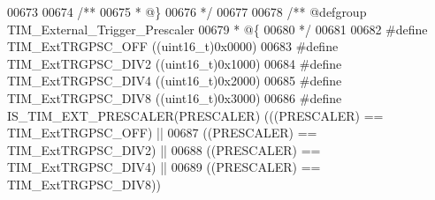 \begin{DoxyCode}
00673 
00674 \textcolor{comment}{/**}
00675 \textcolor{comment}{  * @\}}
00676 \textcolor{comment}{  */}
00677 
00678 \textcolor{comment}{/** @defgroup TIM\_External\_Trigger\_Prescaler }
00679 \textcolor{comment}{  * @\{}
00680 \textcolor{comment}{  */}
00681 
00682 \textcolor{preprocessor}{#}\textcolor{preprocessor}{define} \textcolor{preprocessor}{TIM\_ExtTRGPSC\_OFF}                  \textcolor{preprocessor}{(}\textcolor{preprocessor}{(}\textcolor{preprocessor}{uint16\_t}\textcolor{preprocessor}{)}0x0000\textcolor{preprocessor}{)}
00683 \textcolor{preprocessor}{#}\textcolor{preprocessor}{define} \textcolor{preprocessor}{TIM\_ExtTRGPSC\_DIV2}                 \textcolor{preprocessor}{(}\textcolor{preprocessor}{(}\textcolor{preprocessor}{uint16\_t}\textcolor{preprocessor}{)}0x1000\textcolor{preprocessor}{)}
00684 \textcolor{preprocessor}{#}\textcolor{preprocessor}{define} \textcolor{preprocessor}{TIM\_ExtTRGPSC\_DIV4}                 \textcolor{preprocessor}{(}\textcolor{preprocessor}{(}\textcolor{preprocessor}{uint16\_t}\textcolor{preprocessor}{)}0x2000\textcolor{preprocessor}{)}
00685 \textcolor{preprocessor}{#}\textcolor{preprocessor}{define} \textcolor{preprocessor}{TIM\_ExtTRGPSC\_DIV8}                 \textcolor{preprocessor}{(}\textcolor{preprocessor}{(}\textcolor{preprocessor}{uint16\_t}\textcolor{preprocessor}{)}0x3000\textcolor{preprocessor}{)}
00686 \textcolor{preprocessor}{#}\textcolor{preprocessor}{define} \textcolor{preprocessor}{IS\_TIM\_EXT\_PRESCALER}\textcolor{preprocessor}{(}\textcolor{preprocessor}{PRESCALER}\textcolor{preprocessor}{)} \textcolor{preprocessor}{(}\textcolor{preprocessor}{(}\textcolor{preprocessor}{(}\textcolor{preprocessor}{PRESCALER}\textcolor{preprocessor}{)} \textcolor{preprocessor}{==} TIM_ExtTRGPSC_OFF\textcolor{preprocessor}{)} \textcolor{preprocessor}{||}
00687                                          \textcolor{preprocessor}{(}\textcolor{preprocessor}{(}\textcolor{preprocessor}{PRESCALER}\textcolor{preprocessor}{)} \textcolor{preprocessor}{==} TIM_ExtTRGPSC_DIV2\textcolor{preprocessor}{)} \textcolor{preprocessor}{||}
00688                                          \textcolor{preprocessor}{(}\textcolor{preprocessor}{(}\textcolor{preprocessor}{PRESCALER}\textcolor{preprocessor}{)} \textcolor{preprocessor}{==} TIM_ExtTRGPSC_DIV4\textcolor{preprocessor}{)} \textcolor{preprocessor}{||}
00689                                          \textcolor{preprocessor}{(}\textcolor{preprocessor}{(}\textcolor{preprocessor}{PRESCALER}\textcolor{preprocessor}{)} \textcolor{preprocessor}{==} TIM_ExtTRGPSC_DIV8\textcolor{preprocessor}{)}\textcolor{preprocessor}{)}

\end{DoxyCode}
